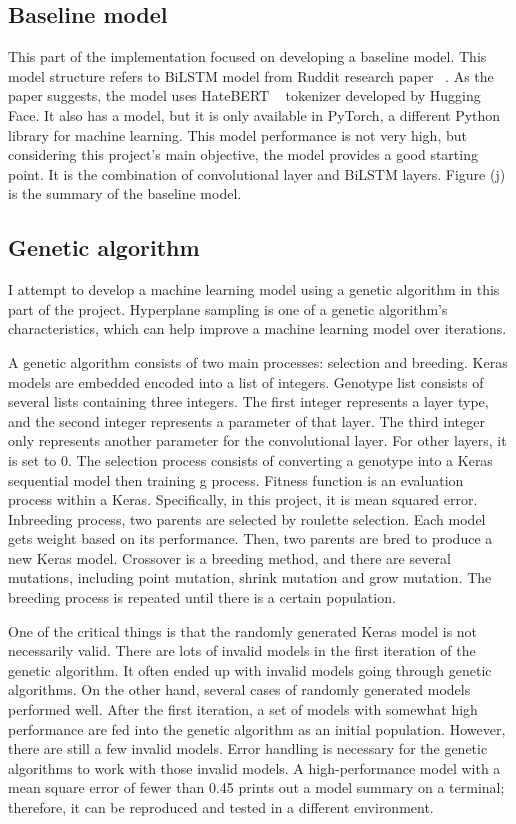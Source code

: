 \documentclass[11pt, natbib=false]{article}
\begin{document}
\subsection{Baseline model}
This part of the implementation focused on developing a baseline model.
This model structure refers to BiLSTM model from Ruddit research paper ~\cite{hada2021ruddit}.
As the paper suggests, the model uses HateBERT ~\cite{caselli2020hatebert} tokenizer developed by Hugging Face.
It also has a model, but it is only available in PyTorch, a different Python library for machine learning.
This model performance is not very high, but considering this project's main objective, the model provides a good starting point.
It is the combination of convolutional layer and BiLSTM layers.
Figure (j) is the summary of the baseline model.

\subsection{Genetic algorithm}
I attempt to develop a machine learning model using a genetic algorithm in this part of the project.
Hyperplane sampling is one of a genetic algorithm's characteristics, which can help improve a machine learning model over iterations.

A genetic algorithm consists of two main processes: selection and breeding.
Keras models are embedded encoded into a list of integers.
Genotype list consists of several lists containing three integers.
The first integer represents a layer type, and the second integer represents a parameter of that layer.
The third integer only represents another parameter for the convolutional layer.
For other layers, it is set to 0.
The selection process consists of converting a genotype into a Keras sequential model then training g process.
Fitness function is an evaluation process within a Keras.
Specifically, in this project, it is mean squared error.
Inbreeding process, two parents are selected by roulette selection.
Each model gets weight based on its performance.
Then, two parents are bred to produce a new Keras model.
Crossover is a breeding method, and there are several mutations, including point mutation, shrink mutation and grow mutation.
The breeding process is repeated until there is a certain population.

One of the critical things is that the randomly generated Keras model is not necessarily valid.
There are lots of invalid models in the first iteration of the genetic algorithm.
It often ended up with invalid models going through genetic algorithms. On the other hand, several cases of randomly generated models performed well.
After the first iteration, a set of models with somewhat high performance are fed into the genetic algorithm as an initial population.
However, there are still a few invalid models.
Error handling is necessary for the genetic algorithms to work with those invalid models.
A high-performance model with a mean square error of fewer than 0.45 prints out a model summary on a terminal; therefore, it can be reproduced and tested in a different environment.
\end{document}
